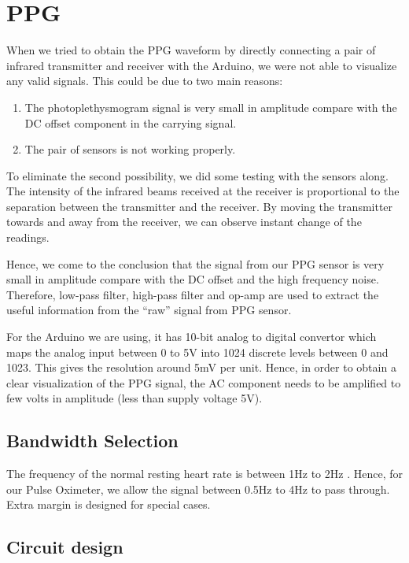 \section{PPG}

When we tried to obtain the PPG waveform by directly connecting a pair of infrared transmitter and receiver with the Arduino, we were not able to visualize any valid signals. This could be due to two main reasons: 

\begin{enumerate}
	\item The photoplethysmogram signal is very small in amplitude compare with the DC offset component in the carrying signal.
	\item The pair of sensors is not working properly.	
\end{enumerate}

To eliminate the second possibility, we did some testing with the sensors along. The intensity of the infrared beams received at the receiver is proportional to the separation between the transmitter and the receiver. By moving the transmitter towards and away from the receiver, we can observe instant change of the readings. 

Hence, we come to the conclusion that the signal from our PPG sensor is very small in amplitude compare with the DC offset and the high frequency noise. Therefore, low-pass filter, high-pass filter and op-amp are used to extract the useful information from the “raw” signal from PPG sensor. 

For the Arduino we are using, it has 10-bit analog to digital convertor which maps the analog input between 0 to 5V into 1024 discrete levels between 0 and 1023. This gives the resolution around 5mV per unit. Hence, in order to obtain a clear visualization of the PPG signal, the AC component needs to be amplified to few volts in amplitude (less than supply voltage 5V). 

\subsection{Bandwidth Selection}

The frequency of the normal resting heart rate is between 1Hz to 2Hz \cite{george8}. Hence, for our Pulse Oximeter, we allow the signal between 0.5Hz to 4Hz to pass through. Extra margin is designed for special cases.

\subsection{Circuit design}

